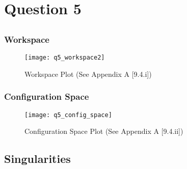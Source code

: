 \newpage
\section{Question 5}
	\subsection{}
		\subsubsection{Workspace}
			\begin{figure}[position = here]
			\begin{centering}
				\texttt{[image: q5\_workspace2]}\\
				\caption [WSpace]{Workspace Plot (See Appendix A [9.4.i])}
			\end{centering}
			\end{figure}
		
		\subsubsection{Configuration Space}
			\begin{figure}[position = here]
			\begin{centering}
				\texttt{[image: q5\_config\_space]}\\
				\caption [CSpace]{Configuration Space Plot (See Appendix A [9.4.ii])}
			\end{centering}
			\end{figure}
			
	\subsection{Singularities}
